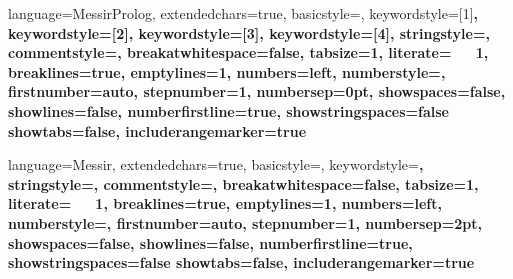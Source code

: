  { 
language=MessirProlog,
extendedchars=true,
basicstyle=\ttfamily,
keywordstyle=[1]\color{blue}\bfseries,
keywordstyle=[2]\color{red},
keywordstyle=[3]\color{msrcolor12}\bfseries,
keywordstyle=[4]\color{msrcolor09}\bfseries,
stringstyle=\color{msrtextcl},
commentstyle=\color{msrcmtcl},
breakatwhitespace=false,
tabsize=1,
literate={\ \ }{{\ }}1,
breaklines=true,
emptylines=1,
numbers=left,
numberstyle=\tiny\color{blue}, 
firstnumber=auto,
stepnumber=1,
numbersep=0pt, 
showspaces=false,
showlines=false,
numberfirstline=true,
showstringspaces=false
showtabs=false,
includerangemarker=true
}



 { 
language=Messir,
extendedchars=true,
basicstyle=\ttfamily,
keywordstyle=\color{msrkeycl}\bfseries,
stringstyle=\color{msrtextcl},
commentstyle=\color{msrcmtcl},
breakatwhitespace=false,
tabsize=1,
literate={\ \ }{{\ }}1,
breaklines=true,
emptylines=1,
numbers=left,
numberstyle=\tiny\bfseries\color{blue}, 
firstnumber=auto,
stepnumber=1,
numbersep=2pt, 
showspaces=false,
showlines=false,
numberfirstline=true,
showstringspaces=false
showtabs=false,
includerangemarker=true
}

